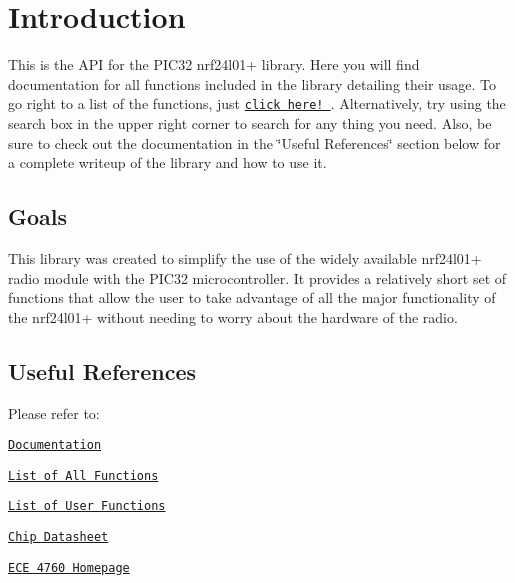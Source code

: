 \hypertarget{index_intro_sec}{}\section{Introduction}\label{index_intro_sec}
This is the A\+PI for the P\+I\+C32 nrf24l01+ library. Here you will find documentation for all functions included in the library detailing their usage. To go right to a list of the functions, just \href{globals_func.html}{\tt click here! }. Alternatively, try using the search box in the upper right corner to search for any thing you need. Also, be sure to check out the documentation in the \char`\"{}\+Useful References\char`\"{} section below for a complete writeup of the library and how to use it.

\subsection*{Goals}

This library was created to simplify the use of the widely available nrf24l01+ radio module with the P\+I\+C32 microcontroller. It provides a relatively short set of functions that allow the user to take advantage of all the major functionality of the nrf24l01+ without needing to worry about the hardware of the radio.

\subsection*{Useful References}

Please refer to\+:


\begin{DoxyItemize}
\item \href{IndependentStudyWriteUp.pdf}{\tt Documentation}  
\item \href{globals_func.html}{\tt List of All Functions}  
\item \href{group___user_func.html}{\tt List of User Functions}  
\item \href{https://www.sparkfun.com/datasheets/Wireless/Nordic/nRF24L01P_Product_Specification_1_0.pdf}{\tt Chip Datasheet} 
\item \href{https://people.ece.cornell.edu/land/courses/ece4760/}{\tt E\+CE 4760 Homepage} 
\end{DoxyItemize}